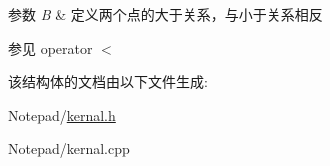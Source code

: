 \begin{DoxyParams}{参数}
{\em B} & 定义两个点的大于关系，与小于关系相反 \\
\hline
\end{DoxyParams}
\begin{DoxySeeAlso}{参见}
operator $<$ 
\end{DoxySeeAlso}


该结构体的文档由以下文件生成\+:\begin{DoxyCompactItemize}
\item 
Notepad/\hyperlink{kernal_8h}{kernal.\+h}\item 
Notepad/kernal.\+cpp\end{DoxyCompactItemize}
